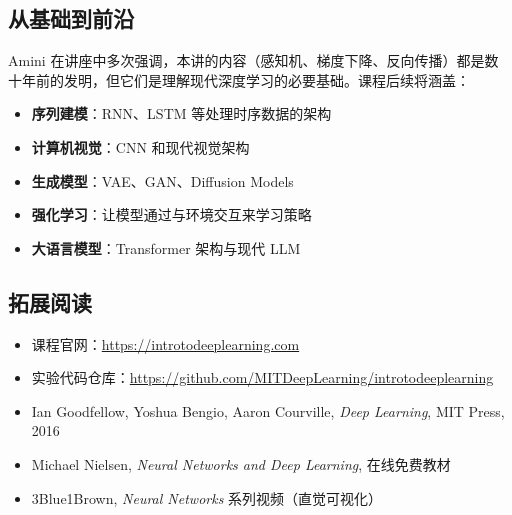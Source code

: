 \subsection{从基础到前沿}

Amini 在讲座中多次强调，本讲的内容（感知机、梯度下降、反向传播）都是数十年前的发明，但它们是理解现代深度学习的必要基础。课程后续将涵盖：

\begin{itemize}
\item \textbf{序列建模}：RNN、LSTM 等处理时序数据的架构
\item \textbf{计算机视觉}：CNN 和现代视觉架构
\item \textbf{生成模型}：VAE、GAN、Diffusion Models
\item \textbf{强化学习}：让模型通过与环境交互来学习策略
\item \textbf{大语言模型}：Transformer 架构与现代 LLM
\end{itemize}

\subsection{拓展阅读}

\begin{itemize}
\item 课程官网：\url{https://introtodeeplearning.com}
\item 实验代码仓库：\url{https://github.com/MITDeepLearning/introtodeeplearning}
\item Ian Goodfellow, Yoshua Bengio, Aaron Courville, \textit{Deep Learning}, MIT Press, 2016
\item Michael Nielsen, \textit{Neural Networks and Deep Learning}, 在线免费教材
\item 3Blue1Brown, \textit{Neural Networks} 系列视频（直觉可视化）
\end{itemize}



